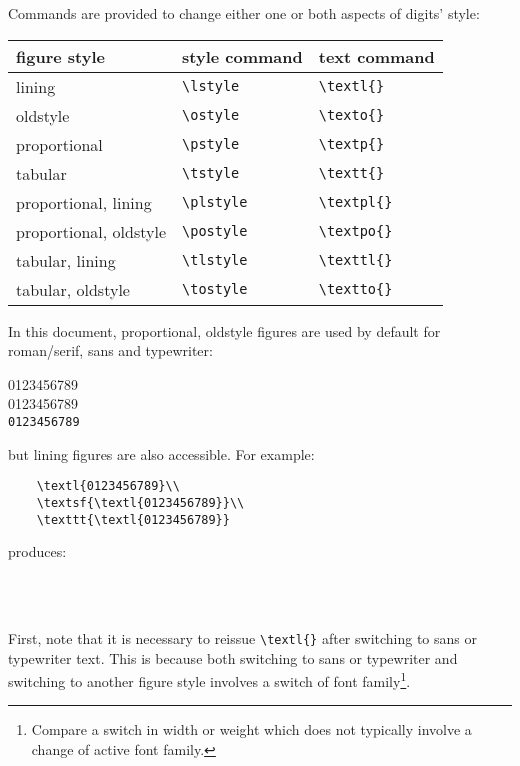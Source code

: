 \documentclass[11pt,british]{article}
\begin{document}
Commands are provided to change either one or both aspects of digits' style:
	\begin{longtable}{lll}
		\toprule
		\textbf{figure style}			&	\textbf{style command}	&	\textbf{text command}\\\midrule\endhead
		\bottomrule\endfoot
		lining										&	\verb|\lstyle|						&	\verb|\textl{}|\\
		oldstyle									&	\verb|\ostyle|						&	\verb|\texto{}|\\
		proportional							&	\verb|\pstyle|						&	\verb|\textp{}|\\
		tabular									&	\verb|\tstyle|						&	\verb|\textt{}|\\		
		proportional, lining				&	\verb|\plstyle|						&	\verb|\textpl{}|\\				
		proportional, oldstyle			&	\verb|\postyle|					&	\verb|\textpo{}|\\				
		tabular, lining						&	\verb|\tlstyle|						&	\verb|\texttl{}|\\				
		tabular, oldstyle					&	\verb|\tostyle|					&	\verb|\textto{}|				
	\end{longtable}
	
In this document, proportional, oldstyle figures are used by default for roman/serif, sans and typewriter:
		\begin{center}
			0123456789\\
			\textsc{0123456789}\\
			\texttt{0123456789}
		\end{center}
but lining figures are also accessible. For example:
\begin{verbatim}
	\textl{0123456789}\\
	\textsf{\textl{0123456789}}\\
	\texttt{\textl{0123456789}}
\end{verbatim}
produces:
		\begin{center}
			\\
			\textsf{}\\
			\texttt{}
		\end{center}
First, note that it is necessary to reissue \verb|\textl{}| after switching to sans or typewriter text. This is because both switching to sans or typewriter and switching to another figure style involves a switch of font family\footnote{Compare a switch in width or weight which does not typically involve a change of active font family.}. 
\end{document}
